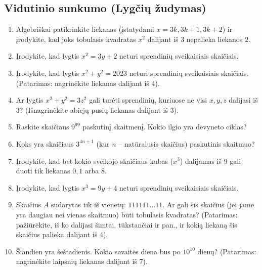 \documentclass[11pt,a4paper]{scrartcl}
\begin{document}
\subsection*{Vidutinio sunkumo (Lygčių žudymas)}
\setcounter{enumi}{10}
\begin{enumerate}
    \item Algebriškai patikrinkite liekanas (įstatydami \(x = 3k, 3k+1, 3k+2\)) ir įrodykite, kad joks tobulasis kvadratas \(x^2\) dalijant iš $3$ nepalieka liekanos $2$.
    \item Įrodykite, kad lygtis \(x^2 = 3y + 2\) neturi sprendinių sveikaisiais skaičiais.
    \item Įrodykite, kad lygtis \(x^2 + y^2 = 2023\) neturi sprendinių sveikaisiais skaičiais. (Patarimas: nagrinėkite liekanas dalijant iš 4).
    \item Ar lygtis \(x^2 + y^2 = 3z^2\) gali turėti sprendinių, kuriuose ne visi \(x, y, z\) dalijasi iš $3$? (Išnagrinėkite abiejų pusių liekanas dalijant iš 3).
    \item Raskite skaičiaus \(9^{99}\) paskutinį skaitmenį. Kokio ilgio yra devyneto ciklas?
    \item Koks yra skaičiaus \(3^{4n+1}\) (kur \(n\) – natūralusis skaičius) paskutinis skaitmuo?
    \item Įrodykite, kad bet kokio sveikojo skaičiaus kubas (\(x^3\)) dalijamas iš $9$ gali duoti tik liekanas $0, 1$ arba $8$.
    \item Įrodykite, kad lygtis \(x^3 = 9y + 4\) neturi sprendinių sveikaisiais skaičiais.
    \item Skaičius \(A\) sudarytas tik iš vienetų: \(111111\dots11\). Ar gali šis skaičius (jei jame yra daugiau nei vienas skaitmuo) būti tobulasis kvadratas? (Patarimas: pažiūrėkite, iš ko dalijasi šimtai, tūkstančiai ir pan., ir kokią liekaną šis skaičius palieka dalijant iš 4).
    \item Šiandien yra šeštadienis. Kokia savaitės diena bus po \(10^{10}\) dienų? (Patarimas: nagrinėkite laipsnių liekanas dalijant iš 7).
\end{enumerate}
\end{document}
